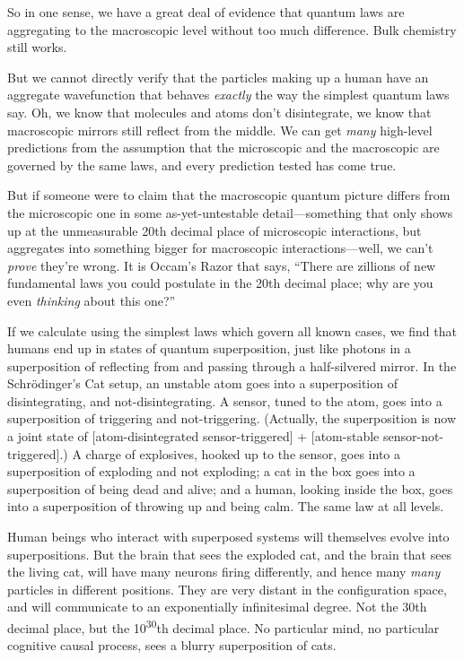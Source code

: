 {
 So in one sense, we have a great deal of evidence that quantum
laws are aggregating to the macroscopic level without too much
difference. Bulk chemistry still works.}

{
 But we cannot directly verify that the particles making up a human
have an aggregate wavefunction that behaves \textit{exactly} the way
the simplest quantum laws say. Oh, we know that molecules and atoms
don't disintegrate, we know that macroscopic mirrors
still reflect from the middle. We can get \textit{many} high-level
predictions from the assumption that the microscopic and the
macroscopic are governed by the same laws, and every prediction tested
has come true.}

{
 But if someone were to claim that the macroscopic quantum picture
differs from the microscopic one in some as-yet-untestable
detail---something that only shows up at the unmeasurable 20th decimal
place of microscopic interactions, but aggregates into something bigger
for macroscopic interactions---well, we can't
\textit{prove} they're wrong. It is
Occam's Razor that says, ``There are
zillions of new fundamental laws you could postulate in the 20th
decimal place; why are you even \textit{thinking} about this
one?''}

{
 If we calculate using the simplest laws which govern all known
cases, we find that humans end up in states of quantum superposition,
just like photons in a superposition of reflecting from and passing
through a half-silvered mirror. In the Schrödinger's
Cat setup, an unstable atom goes into a superposition of
disintegrating, and not-disintegrating. A sensor, tuned to the atom,
goes into a superposition of triggering and not-triggering. (Actually,
the superposition is now a joint state of [atom-disintegrated
{\texttimes} sensor-triggered] + [atom-stable {\texttimes}
sensor-not-triggered].) A charge of explosives, hooked up to the
sensor, goes into a superposition of exploding and not exploding; a cat
in the box goes into a superposition of being dead and alive; and a
human, looking inside the box, goes into a superposition of throwing up
and being calm. The same law at all levels.}

{
 Human beings who interact with superposed systems will themselves
evolve into superpositions. But the brain that sees the exploded cat,
and the brain that sees the living cat, will have many neurons firing
differently, and hence many \textit{many} particles in different
positions. They are very distant in the configuration space, and will
communicate to an exponentially infinitesimal degree. Not the 30th
decimal place, but the 10\textsuperscript{30}th decimal place. No
particular mind, no particular cognitive causal process, sees a blurry
superposition of cats.}

